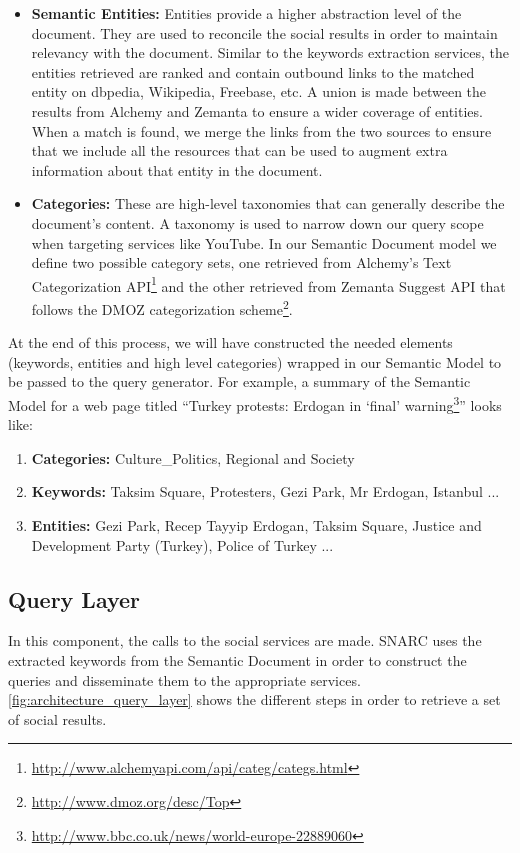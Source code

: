 \begin{enumerate}
\begin{itemize}
\item {\bf Semantic Entities:} Entities provide a higher abstraction level of the document. They are used to reconcile the social results in order to maintain relevancy with the document. Similar to the keywords extraction services, the entities retrieved are ranked and contain outbound links to the matched entity on dbpedia, Wikipedia, Freebase, etc. A union is made between the results from Alchemy and Zemanta to ensure a wider coverage of entities. When a match is found, we merge the links from the two sources to ensure that we include all the resources that can be used to augment extra information about that entity in the document.
\item {\bf Categories:} These are high-level taxonomies that can generally describe the document's content. A taxonomy is used to narrow down our query scope when targeting services like YouTube. In our Semantic Document model we define two possible category sets, one retrieved from Alchemy's Text Categorization API\footnote{\url{http://www.alchemyapi.com/api/categ/categs.html}} and the other retrieved from Zemanta Suggest API that follows the DMOZ categorization scheme\footnote{\url{http://www.dmoz.org/desc/Top}}.
\end{itemize}
\end{enumerate}

At the end of this process, we will have constructed the needed elements (keywords, entities and high level categories) wrapped in our Semantic Model to be passed to the query generator. For example, a summary of the Semantic Model for a web page titled ``Turkey protests: Erdogan in `final' warning\footnote{\url{http://www.bbc.co.uk/news/world-europe-22889060}}'' looks like:
\begin{enumerate}
\item {\bf Categories:} Culture\_Politics, Regional and Society
\item {\bf Keywords:} Taksim Square, Protesters, Gezi Park, Mr Erdogan, Istanbul ...
\item {\bf Entities:} Gezi Park, Recep Tayyip Erdogan, Taksim Square, Justice and Development Party (Turkey), Police of Turkey ...
\end{enumerate}

\subsection{Query Layer}
In this component, the calls to the social services are made. SNARC uses the extracted keywords from the Semantic Document in order to construct the queries and disseminate them to the appropriate services. \ref{fig:architecture_query_layer} shows the different steps in order to retrieve a set of social results.

